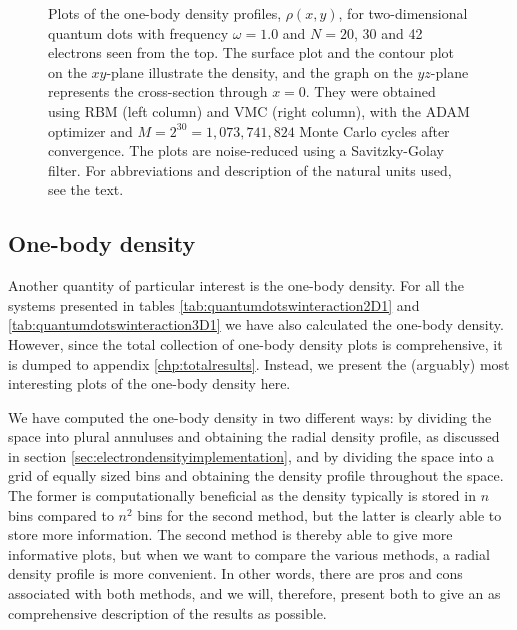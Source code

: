 \begin{figure}
	\caption{Plots of the one-body density profiles, $\rho(x,y)$, for two-dimensional quantum dots with frequency $\omega=1.0$ and $N=20$, 30 and 42 electrons seen from the top. The surface plot and the contour plot on the $xy$-plane illustrate the density, and the graph on the $yz$-plane represents the cross-section through $x=0$. They were obtained using RBM (left column) and VMC (right column), with the ADAM optimizer and $M=2^{30}=1,073,741,824$ Monte Carlo cycles after convergence. The plots are noise-reduced using a Savitzky-Golay filter. For abbreviations and description of the natural units used, see the text.}
	\label{fig:OB_interaction_1p0w2}
\end{figure}

\subsection{One-body density} \label{sec:onebodyresults}
Another quantity of particular interest is the one-body density. For all the systems presented in tables \eqref{tab:quantumdotswinteraction2D1} and \eqref{tab:quantumdotswinteraction3D1} we have also calculated the one-body density. However, since the total collection of one-body density plots is comprehensive, it is dumped to appendix \ref{chp:totalresults}. Instead, we present the (arguably) most interesting plots of the one-body density here. 

We have computed the one-body density in two different ways: by dividing the space into plural annuluses and obtaining the radial density profile, as discussed in section \ref{sec:electrondensityimplementation}, and by dividing the space into a grid of equally sized bins and obtaining the density profile throughout the space. The former is computationally beneficial as the density typically is stored in $n$ bins compared to $n^2$ bins for the second method, but the latter is clearly able to store more information. The second method is thereby able to give more informative plots, but when we want to compare the various methods, a radial density profile is more convenient. In other words, there are pros and cons associated with both methods, and we will, therefore, present both to give an as comprehensive description of the results as possible. 

